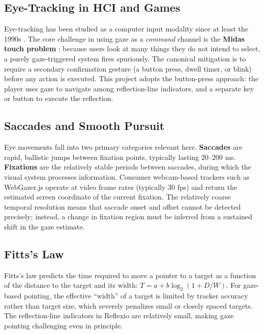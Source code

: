 \documentclass[11pt,twocolumn]{article}
\begin{document}
\subsection{Eye-Tracking in HCI and Games}

Eye-tracking has been studied as a computer input modality since at least the
1990s \cite{jacob1991}. The core challenge in using gaze as a \emph{command}
channel is the \textbf{Midas touch problem} \cite{jacob1990}: because users
look at many things they do not intend to select, a purely gaze-triggered
system fires spuriously. The canonical mitigation is to require a secondary
confirmation gesture (a button press, dwell timer, or blink) before any action
is executed. This project adopts the button-press approach: the player uses
gaze to navigate among reflection-line indicators, and a separate key or button
to execute the reflection.

\subsection{Saccades and Smooth Pursuit}

Eye movements fall into two primary categories relevant here. \textbf{Saccades}
are rapid, ballistic jumps between fixation points, typically lasting 20--200
ms. \textbf{Fixations} are the relatively stable periods between saccades,
during which the visual system processes information. Consumer webcam-based
trackers such as WebGazer.js operate at video frame rates (typically 30 fps)
and return the estimated screen coordinate of the current fixation. The
relatively coarse temporal resolution means that saccade onset and offset cannot
be detected precisely; instead, a change in fixation region must be inferred
from a sustained shift in the gaze estimate.

\subsection{Fitts's Law}

Fitts's law \cite{fitts1954} predicts the time required to move a pointer to a
target as a function of the distance to the target and its width:
$T = a + b \log_2\!\left(1 + D/W\right)$. For gaze-based pointing, the
effective ``width'' of a target is limited by tracker accuracy rather than
target size, which severely penalizes small or closely spaced targets. The
reflection-line indicators in Reflexio are relatively small, making gaze
pointing challenging even in principle.
\end{document}
